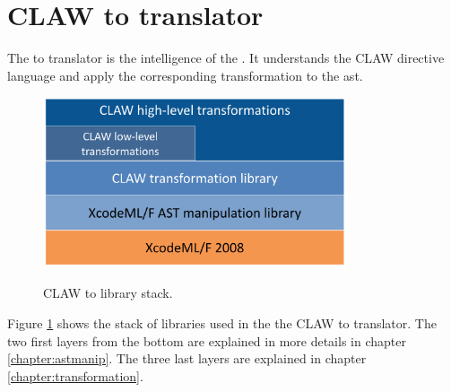 \section{CLAW \xcodeml to \xcodeml translator}
The \xcodeml to \xcodeml translator is the intelligence of the \clawfcomp. It
understands the CLAW directive language and apply the corresponding
transformation to the \xcodeml \gls{ast}.

\begin{figure}[!ht]
  \centering
  \includegraphics[width=0.8\textwidth]{resources/cx2x_stack.png} \\
  \caption{CLAW \xcodeml to \xcodeml library stack.}
  \label{fig:cx2x_stack}
\end{figure}

Figure \ref{fig:cx2x_stack} shows the stack of libraries used in the the CLAW
\xcodeml to \xcodeml translator. The two first layers from the bottom are
explained in more details in chapter \ref{chapter:astmanip}. The three last
layers are explained in chapter \ref{chapter:transformation}.
